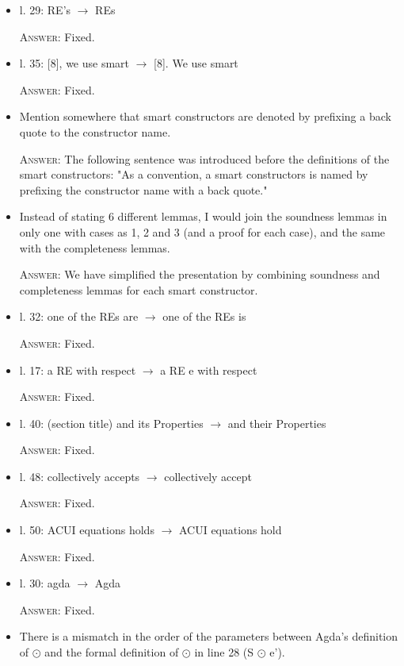 \documentclass{article}
\begin{document}
\begin{itemize}
    \item l. 29: RE's $\to$ REs

    \textsc{Answer}: Fixed.

    \item l. 35: [8], we use smart $\to$ [8]. We use smart

    \textsc{Answer}: Fixed.

    \item Mention somewhere that smart constructors are denoted by prefixing a back quote to the constructor name.

    \textsc{Answer}: The following sentence was introduced before the definitions of the smart constructors:
    "As a convention, a smart constructors is named by prefixing the constructor name with a back quote."


    \item Instead of stating 6 different lemmas, I would join the soundness lemmas in only 
     one with cases as 1, 2 and 3 (and a proof for each case), and the same with the completeness lemmas.

    \textsc{Answer}:  We have simplified the presentation by combining soundness and completeness lemmas for each smart constructor.

    \item l. 32: one of the REs are $\to$ one of the REs is

    \textsc{Answer}: Fixed.

    \item l. 17: a RE with respect $\to$ a RE e with respect

    \textsc{Answer}: Fixed.

    \item l. 40: (section title) and its Properties $\to$ and their Properties

    \textsc{Answer}: Fixed.

    \item l. 48: collectively accepts $\to$ collectively accept

    \textsc{Answer}: Fixed.

    \item l. 50: ACUI equations holds $\to$ ACUI equations hold
    
    \textsc{Answer}: Fixed.

    \item l. 30: agda $\to$ Agda

    \textsc{Answer}: Fixed.

    \item There is a mismatch in the order of the parameters between Agda's definition of $\odot$ and the formal definition of $\odot$ in line 28 (S $\odot$ e').


\end{itemize}
\end{document}
